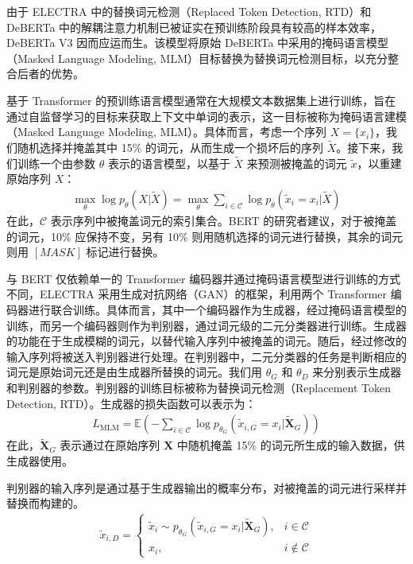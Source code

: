 由于 ELECTRA \cite{clark2020electrapretrainingtextencoders} 中的替换词元检测（Replaced Token Detection, RTD）和 DeBERTa 中的解耦注意力机制已被证实在预训练阶段具有较高的样本效率，DeBERTa V3 因而应运而生。该模型将原始 DeBERTa 中采用的掩码语言模型（Masked Language Modeling, MLM）目标替换为替换词元检测目标，以充分整合后者的优势。

基于 Transformer 的预训练语言模型通常在大规模文本数据集上进行训练，旨在通过自监督学习的目标来获取上下文中单词的表示，这一目标被称为掩码语言建模（Masked Language Modeling, MLM）\cite{devlin_bert_2019}。具体而言，考虑一个序列 \(X = \{x_i\}\)，我们随机选择并掩盖其中 15\% 的词元，从而生成一个损坏后的序列 \(\tilde{X}\)。接下来，我们训练一个由参数 \(\theta\) 表示的语言模型，以基于 \(\tilde{X}\) 来预测被掩盖的词元 \(\tilde{x}\)，以重建原始序列 \(X\)：
\begin{align}
\max_{\theta} \log p_{\theta}(X|\tilde{X}) = \max_{\theta} \sum_{i \in \mathcal{C}} \log p_{\theta}(\tilde{x}_i = x_i|\tilde{X})
\end{align}
在此，\(\mathcal{C}\) 表示序列中被掩盖词元的索引集合。BERT 的研究者建议，对于被掩盖的词元，10\% 应保持不变，另有 10\% 则用随机选择的词元进行替换，其余的词元则用 \([MASK]\) 标记进行替换。

与 BERT 仅依赖单一的 Transformer 编码器并通过掩码语言模型进行训练的方式不同，ELECTRA 采用生成对抗网络（GAN）的框架，利用两个 Transformer 编码器进行联合训练。具体而言，其中一个编码器作为生成器，经过掩码语言模型的训练，而另一个编码器则作为判别器，通过词元级的二元分类器进行训练。生成器的功能在于生成模糊的词元，以替代输入序列中被掩盖的词元。随后，经过修改的输入序列将被送入判别器进行处理。在判别器中，二元分类器的任务是判断相应的词元是原始词元还是由生成器所替换的词元。我们用 \(\theta_G\) 和 \(\theta_D\) 来分别表示生成器和判别器的参数。判别器的训练目标被称为替换词元检测（Replacement Token Detection, RTD）。生成器的损失函数可以表示为：
\begin{align} 
L_{\text{MLM}} = \mathbb{E} \left( - \sum_{i \in \mathcal{C}} \log p_{\theta_G}(\tilde{x}_{i,G} = x_i|\tilde{\mathbf{X}}_G) \right)
\end{align}
在此，\(\tilde{\mathbf{X}}_G\) 表示通过在原始序列 \(\mathbf{X}\) 中随机掩盖 15\% 的词元所生成的输入数据，供生成器使用。

判别器的输入序列是通过基于生成器输出的概率分布，对被掩盖的词元进行采样并替换而构建的。
\begin{align} 
\tilde{x}_{i,D} = \begin{cases} \tilde{x}_{i} \sim p_{\theta_G}(\tilde{x}_{i,G} = x_i|\tilde{\mathbf{X}}_G), & i \in \mathcal{C} \\ x_i, & i \notin \mathcal{C} \end{cases}
\end{align}

